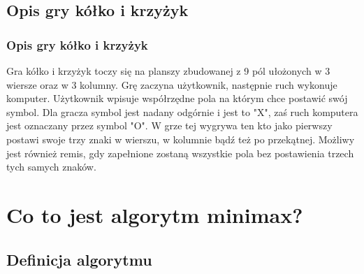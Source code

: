 \documentclass{beamer}
\begin{document}
\subsection{Opis gry kółko i krzyżyk}
\begin{frame}
\frametitle{Opis gry kółko i krzyżyk}
Gra kółko i krzyżyk toczy się na planszy zbudowanej z 9 pól ułożonych w 3 wiersze oraz w 3 kolumny. Grę zaczyna użytkownik, następnie ruch wykonuje komputer. Użytkownik wpisuje współrzędne pola na którym chce postawić swój symbol. Dla gracza symbol jest nadany odgórnie i jest to "X", zaś ruch komputera jest oznaczany przez symbol "O". W grze tej wygrywa ten kto jako pierwszy postawi swoje trzy znaki w wierszu, w kolumnie bądź też po przekątnej. Możliwy jest również remis, gdy zapełnione zostaną wszystkie pola bez postawienia trzech tych samych znaków.
\end{frame} %


\section{Co to jest algorytm minimax?}

\subsection{Definicja algorytmu}
\end{document}
